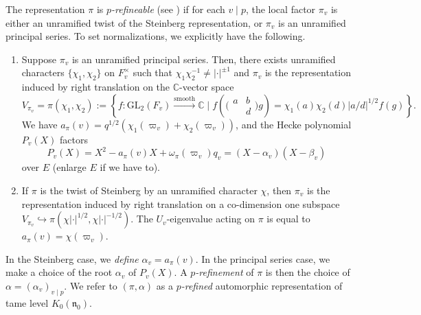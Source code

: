 \documentclass[10pt, twoside]{amsart}
\theoremstyle{plain}
\theoremstyle{definition}
\theoremstyle{remark}
\numberwithin{equation}{subsection}
\def\C{\mathbb C}
\def\GL{\mathrm{GL}}
\def\gn{\mathfrak n}
\newcommand{\smallmat}[4]{\bigl(\begin{smallmatrix}#1&#2\\#3&#4\end{smallmatrix}\bigr)}
\begin{document}
The representation $\pi$ is \emph{$p$-refineable} (see \cite[Definition 3.4.2]{BH}) if for each $v \mid p$, the local factor $\pi_v$ is either an unramified twist of the Steinberg representation, or $\pi_v$ is an unramified principal series. To set normalizations, we explicitly have the following.
\begin{enumerate}[label=(\alph*)]
\item Suppose $\pi_v$ is an unramified principal series. Then, there exists unramified characters $\{\chi_1,\chi_2\}$ on $F_v^\times$ such that $\chi_1\chi_2^{-1} \neq |\cdot|^{\pm 1}$ and $\pi_v$ is the representation induced by right translation on the $\C$-vector space 
\begin{equation*}
V_{\pi_v} = \pi(\chi_1,\chi_2) := \left\{f : \GL_2(F_v) \xrightarrow{\text{smooth}} \C \mid f\left(\smallmat {a}{b}{}{d} g\right) = \chi_1(a)\chi_2(d)|a/d|^{1/2} f(g)\right\}.
\end{equation*}
We have $a_\pi(v) = q^{1/2}(\chi_1(\varpi_v) + \chi_2(\varpi_v))$, and the Hecke polynomial $P_v(X)$ factors
$$
P_v(X)=X^2-a_\pi(v)X+\omega_\pi(\varpi_v)q_v = (X-\alpha_v)(X-\beta_v)
$$
over $E$ (enlarge $E$ if we have to). 
\item  If $\pi$ is the twist of Steinberg by an unramified character $\chi$, then $\pi_v$ is the representation induced by right translation 
on a co-dimension one subspace $V_{\pi_v} \hookrightarrow \pi(\chi |\cdot|^{1/2}, \chi|\cdot|^{-1/2})$. The $U_v$-eigenvalue acting on $\pi$ is equal to $a_\pi(v) = \chi(\varpi_v)$. 
\end{enumerate}
In the Steinberg case, we {\em define} $\alpha_v = a_\pi(v)$. In the principal series case, we make a choice of the root $\alpha_v$ of $P_v(X)$. A {\em $p$-refinement} of $\pi$ is then the choice of $\alpha = (\alpha_v)_{v \mid p}$. We refer to $(\pi,\alpha)$ as a \emph{$p$-refined} automorphic representation of tame level $K_0(\gn_0)$.
\end{document}
